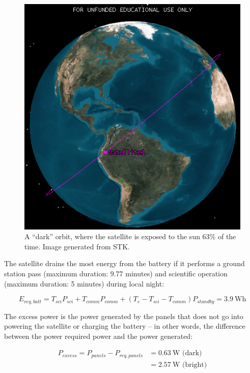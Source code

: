 \documentclass[12pt]{article}
\begin{document}
\begin{figure}[ht]%
\centering
\includegraphics{images/power-dark-orbit}%
\caption{A ``dark'' orbit, where the satellite is exposed to the sun 63\% of the time.  Image generated from STK.}%
\label{fig:power-dark-orbit}%
\end{figure}

The satellite drains the most energy from the battery if it performs a ground station pass (maximum duration: 9.77 minutes) and scientific operation (maximum duration: 5 minutes) during local night:

\begin{equation}
E_{req,batt} = T_{sci} P_{sci} + T_{comm} P_{comm} + (T_e - T_{sci} - T_{comm}) P_{standby} = 3.9 \ \text{Wh}
\label{eq:power-batt-req}
\end{equation}

The excess power is the power generated by the panels that does not go into powering the satellite or charging the battery -- in other words, the difference between the power required power and the power generated:

\begin{align}
P_{excess} = P_{panels} - P_{req,panels} &= 0.63 \ \text{W (dark)}\\ \nonumber
&= 2.57 \ \text{W (bright)}
\label{eq:power-excess}
\end{align}
\end{document}
